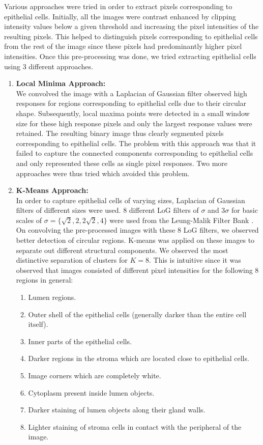 Various approaches were tried in order to extract pixels corresponding to epithelial cells. Initially, all the images were contrast enhanced by clipping intensity values below a given threshold and increasing the pixel intensities of the resulting pixels. This helped to distinguish pixels corresponding to epithelial cells from the rest of the image since these pixels had predominantly higher pixel intensities. Once this pre-processing was done, we tried extracting epithelial cells using 3 different approaches.

\begin{enumerate}

\item \textbf{Local Minima Approach:}\\
We convolved the image with a Laplacian of Gaussian filter observed high responses for regions corresponding to epithelial cells due to their circular shape. Subsequently, local maxima points were detected in a small window size for these high response pixels and only the largest response values were retained. The resulting binary image thus clearly segmented pixels corresponding to epithelial cells. The problem with this approach was that it failed to capture the connected components corresponding to epithelial cells and only represented these cells as single pixel responses. Two more approaches were thus tried which avoided this problem.

\item \textbf{K-Means Approach:}\\
In order to capture epithelial cells of varying sizes, Laplacian of Gaussian filters of different sizes were used. 8 different LoG filters of $\sigma$ and $3 \sigma$ for basic scales of $\sigma = \{\sqrt{2}, 2, 2\sqrt{2}, 4\}$ were used from the Leung-Malik Filter Bank \cite{lmfb}. On convolving the pre-processed images with these 8 LoG filters, we observed better detection of circular regions. K-means was applied on these images to separate out different structural components. We observed the most distinctive separation of clusters for $K = 8$. This is intuitive since it was observed that images consisted of different pixel intensities for the following 8 regions in general:

\begin{enumerate}

\item Lumen regions.
\item Outer shell of the epithelial cells (generally darker than the entire cell itself).
\item Inner parts of the epithelial cells.
\item Darker regions in the stroma which are located close to epithelial cells.
\item Image corners which are completely white.
\item Cytoplasm present inside lumen objects.
\item Darker staining of lumen objects along their gland walls.
\item Lighter staining of stroma cells in contact with the peripheral of the image.


\end{enumerate}
\end{enumerate}
